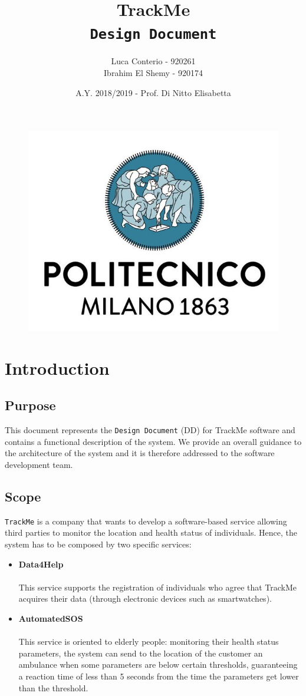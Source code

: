 \documentclass[12pt,a4paper]{article}
\author{Luca Conterio - 920261\\
	Ibrahim El Shemy - 920174}
\date{A.Y. 2018/2019 - Prof. Di Nitto Elisabetta}
\title{%
	\textbf{\Huge{TrackMe}} \\
	\large \texttt{Design Document}
}
\begin{document}
	\begin{figure}
		\centering
		\includegraphics[width=1.0\linewidth]{images/polimi}
	\end{figure}
	\maketitle

	\newpage
	\tableofcontents
	\newpage

	\section{Introduction}
	\subsection{Purpose}
	This document represents the \texttt{Design Document} (DD) for TrackMe software and contains a functional description of the system. We provide an overall guidance to the architecture of the system and it is therefore addressed to the software development team.
	\subsection{Scope}
	\texttt{TrackMe} is a company that wants to develop a software-based service allowing third parties to monitor the location and health status of individuals. Hence, the system has to be composed by two specific services:
	\begin{itemize}
	 	\item \textbf{Data4Help}\\\\
	 	This service supports the registration of individuals who agree that TrackMe acquires their data (through electronic devices such as smartwatches).
	 	\item \textbf{AutomatedSOS}\\\\ 
	 	This service is oriented to elderly people: monitoring their health status parameters, the system can send to the location of the customer an ambulance when some parameters are below certain thresholds, guaranteeing a reaction time of less than 5 seconds from the time the parameters get lower than the threshold.
	\end{itemize}
\end{document}
